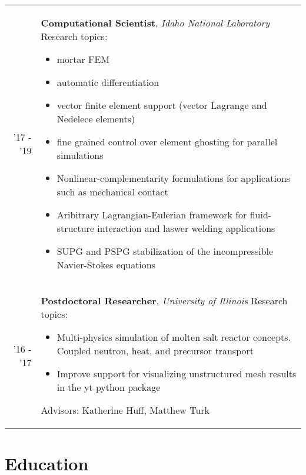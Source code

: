 \documentclass[a4paper,10pt]{article} %
\begin{document}
\begin{table}[h]
  \begin{tabularx}{\textwidth}{r>{\raggedright\arraybackslash}X}

    \textsc{'17 - '19} & \textbf{Computational Scientist}, \textit{Idaho National Laboratory}\newline
    Research topics:
    \begin{itemize}
    \item mortar FEM
    \item automatic differentiation
    \item vector finite element support (vector Lagrange and Nedelece elements)
    \item fine grained control over element ghosting for parallel simulations
    \item Nonlinear-complementarity formulations for applications such as mechanical contact
    \item Aribitrary Lagrangian-Eulerian framework for fluid-structure interaction and laswer welding applications
    \item SUPG and PSPG stabilization of the incompressible Navier-Stokes equations
    \end{itemize}\\

    \textsc{'16 - '17} & \textbf{Postdoctoral Researcher}, \textit{University of Illinois} \newline
    Research topics:
    \begin{itemize}
    \item Multi-physics simulation of molten salt reactor concepts. Coupled neutron, heat, and precursor transport
    \item Improve support for visualizing unstructured mesh results in the yt python package
    \end{itemize}
    Advisors: Katherine Huff, Matthew Turk\\

  \end{tabularx}
\end{table}


\section{Education}
\end{document}
